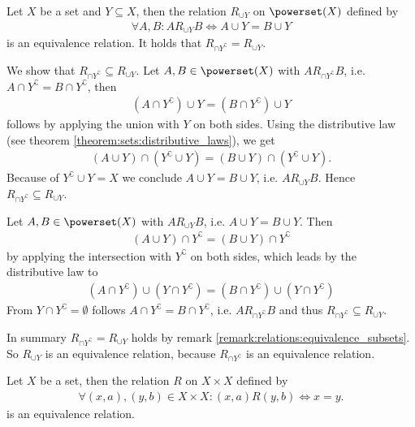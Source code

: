 \begin{examples}
\begin{exampleenumerate}
\begin{miniproof}
        \end{miniproof}
        \item\label{example:relations:union_relation} Let $X$ be a set and $Y\subseteq X$, then the relation $R_{\cup Y}$ on $\powerset(X)$ defined by \begin{align}\forall A,B\colon A R_{\cup Y} B\iff A\cup Y=B\cup Y\end{align}
        is an equivalence relation. It holds that $R_{\cap Y^\complement}=R_{\cup Y}$.
        \begin{miniproof}
            \proofsubset We show that $R_{\cap Y^\complement}\subseteq R_{\cup Y}$. Let $A,B\in\powerset(X)$ with $A R_{\cap Y^\complement} B$, i.e. $A\cap Y^\complement=B\cap Y^\complement$, then \begin{align}(A\cap Y^\complement)\cup Y=(B\cap Y^\complement)\cup Y\end{align} follows by applying the union with $Y$ on both sides. Using the distributive law (see theorem \ref{theorem:sets:distributive_laws}), we get \begin{align}(A\cup Y)\cap (Y^\complement\cup Y)=(B\cup Y)\cap (Y^\complement\cup Y).\end{align} Because of $Y^\complement\cup Y=X$ we conclude $A\cup Y=B\cup Y$, i.e. $A R_{\cup Y} B$. Hence $R_{\cap Y^\complement}\subseteq R_{\cup Y}$.

            \proofsupset Let $A,B\in\powerset(X)$ with $A R_{\cup Y} B$, i.e. $A\cup Y=B\cup Y$. Then \begin{align}(A\cup Y)\cap Y^\complement=(B\cup Y)\cap Y^\complement\end{align} by applying the intersection with $Y^\complement$ on both sides, which leads by the distributive law to \begin{align}(A\cap Y^\complement)\cup(Y\cap Y^\complement)=(B\cap Y^\complement)\cup(Y\cap Y^\complement)\end{align} From $Y\cap Y^\complement=\emptyset$ follows $A\cap Y^\complement=B\cap Y^\complement$, i.e. $A R_{\cap Y^\complement} B$ and thus $R_{\cap Y^\complement}\subseteq R_{\cup Y}$.

            In summary $R_{\cap Y^\complement}=R_{\cup Y}$ holds by remark \ref{remark:relations:equivalence_subsets}. So $R_{\cup Y}$ is an equivalence relation, because $R_{\cap Y^\complement}$ is an equivalence relation.
        \end{miniproof}
        \item\label{example:relations:projection_equivalence_relation} Let $X$ be a set, then the relation $R$ on $X\times X$ defined by \begin{align}\forall (x,a),(y,b)\in X\times X\colon (x,a)R(y,b)\iff x=y.\end{align}
        is an equivalence relation.
        


\end{exampleenumerate}
\end{examples}
